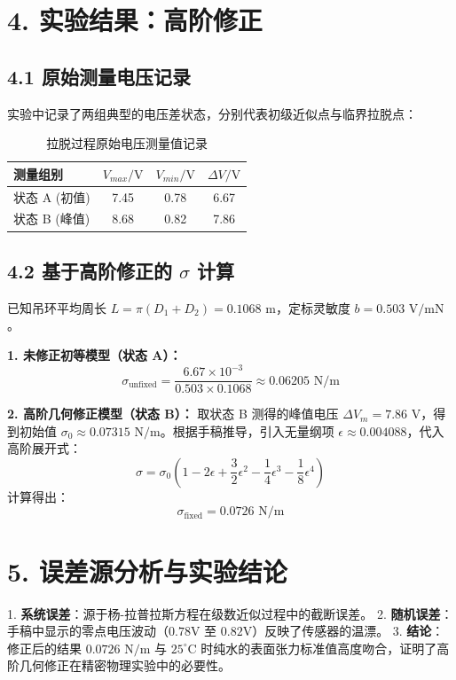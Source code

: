 \documentclass[twocolumn, 10pt, UTF8]{ctexart}
\begin{document}
	\section{4. 实验结果：高阶修正}
	
	\subsection{4.1 原始测量电压记录}
	实验中记录了两组典型的电压差状态，分别代表初级近似点与临界拉脱点：
	\begin{table}[htbp]
		\centering
		\caption{拉脱过程原始电压测量值记录}
		\small
		\begin{tabular}{lccc}
			\toprule
			测量组别 & $V_{max}/\text{V}$ & $V_{min}/\text{V}$ & $\Delta V/\text{V}$ \\
			\midrule
			状态 A (初值) & 7.45 & 0.78 & 6.67 \\
			状态 B (峰值) & 8.68 & 0.82 & 7.86 \\
			\bottomrule
		\end{tabular}
	\end{table}
	
	\subsection{4.2 基于高阶修正的 $\sigma$ 计算}
	已知吊环平均周长 $L = \pi(D_1+D_2) = 0.1068\text{ m}$，定标灵敏度 $b=0.503\text{ V/mN}$。
	
	\textbf{1. 未修正初等模型（状态 A）：}
	\begin{equation}
		\sigma_{\text{unfixed}} = \frac{6.67 \times 10^{-3}}{0.503 \times 0.1068} \approx 0.06205 \text{ N/m}
	\end{equation}
	
	\textbf{2. 高阶几何修正模型（状态 B）：}
	取状态 B 测得的峰值电压 $\Delta V_m = 7.86\text{ V}$，得到初始值 $\sigma_0 \approx 0.07315\text{ N/m}$。根据手稿推导，引入无量纲项 $\epsilon \approx 0.004088$，代入高阶展开式：
	\begin{equation}
		\sigma = \sigma_0 \left( 1 - 2\epsilon + \frac{3}{2}\epsilon^2 - \frac{1}{4}\epsilon^3 - \frac{1}{8}\epsilon^4 \right)
	\end{equation}
	计算得出：
	\begin{equation}
		\sigma_{\text{fixed}} = 0.0726 \text{ N/m}
	\end{equation}
	
	\section{5. 误差源分析与实验结论}
	1. \textbf{系统误差}：源于杨-拉普拉斯方程在级数近似过程中的截断误差。
	2. \textbf{随机误差}：手稿中显示的零点电压波动（$0.78\text{V}$ 至 $0.82\text{V}$）反映了传感器的温漂。
	3. \textbf{结论}：修正后的结果 $0.0726\text{ N/m}$ 与 $25^\circ\text{C}$ 时纯水的表面张力标准值高度吻合，证明了高阶几何修正在精密物理实验中的必要性。
	
\end{document}
